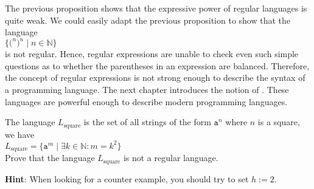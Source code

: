 \remarkEng
The previous proposition shows that the expressive power of regular languages is quite weak.
We could easily adapt the previous proposition to show that the language
\\[0.2cm]
\hspace*{1.3cm}
$\bigl\{ \mathtt{(}^n \mathtt{)}^n \mid n \in \mathbb{N} \bigr\}$
\\[0.2cm]
is not regular.  Hence, regular expressions are unable to check even such simple questions as to
whether the parentheses in an expression are balanced.  Therefore, the concept of regular
expressions is not strong enough to describe the syntax of a programming language.
The next chapter introduces the notion of .  These languages
are powerful enough to describe modern programming languages. 

\exerciseEng
The language  $L_{\mathrm{square}}$ is the set of all strings of the form $\mathtt{a}^n$ where $n$
is a square, we have
\\[0.2cm]
\hspace*{1.3cm}
$L_{\mathrm{square}} = \bigl\{ \mathtt{a}^{m} \mid \exists k \in \mathbb{N}: m = k^2 \bigr\}$
\\[0.2cm]
Prove that the language  $L_{\mathrm{square}}$ is not a regular language.
\eox
\vspace*{0.1cm}

\noindent
\textbf{Hint}:  When looking for a counter example, you should try to set $h:=2$.


